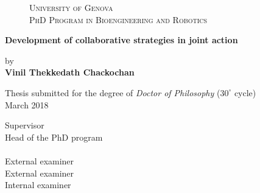 
\thispagestyle{empty}

\begin{figure}[h!]
 \centering
	\begin{center} 
		\Large
		{\textsc{University of Genova}}\\
		  \vspace{0.5em}
		  \large
	         \textsc{PhD Program in Bioengineering and Robotics}\\

	\end{center}
\end{figure}



\begin{center} 
	


		\LARGE
		\textbf{Development of collaborative strategies in joint action} \\
\end{center}

 	\begin{center} 
		by \\
		\vspace{0.5em}
		\textbf{Vinil Thekkedath Chackochan}\\
		\vspace{1em}
	
		
	\vspace{1cm}	
		\normalsize
		Thesis submitted for the degree of \textit{Doctor of Philosophy} ($30^\circ$ cycle) \\
	\vspace{1cm}	
		\normalsize
		March 2018\\
	\end{center}
	\vspace{2em}

\vfill


	 \hfill  {Supervisor}	
	\\
		\hfill  {Head of the PhD program}	
	\vspace{1em} \\
	\\
		\hfill  {External examiner}	
	\\
		\hfill  {External examiner}
	\\
			 \hfill  {Internal examiner}

